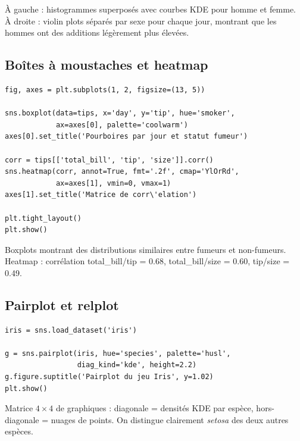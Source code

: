 \begin{codeoutput}
\`A gauche : histogrammes superpos\'es avec courbes KDE pour homme et femme. \`A droite : violin plots s\'epar\'es par sexe pour chaque jour, montrant que les hommes ont des additions l\'eg\`erement plus \'elev\'ees.
\end{codeoutput}

\subsection{Bo\^ites \`a moustaches et heatmap}

\begin{codeblock}[title=\textbf{Python}]
\begin{verbatim}
fig, axes = plt.subplots(1, 2, figsize=(13, 5))

sns.boxplot(data=tips, x='day', y='tip', hue='smoker',
            ax=axes[0], palette='coolwarm')
axes[0].set_title('Pourboires par jour et statut fumeur')

corr = tips[['total_bill', 'tip', 'size']].corr()
sns.heatmap(corr, annot=True, fmt='.2f', cmap='YlOrRd',
            ax=axes[1], vmin=0, vmax=1)
axes[1].set_title('Matrice de corr\'elation')

plt.tight_layout()
plt.show()
\end{verbatim}
\end{codeblock}

\begin{codeoutput}
Boxplots montrant des distributions similaires entre fumeurs et non-fumeurs. Heatmap : corr\'elation total\_bill/tip = 0.68, total\_bill/size = 0.60, tip/size = 0.49.
\end{codeoutput}

\subsection{Pairplot et relplot}

\begin{codeblock}[title=\textbf{Python}]
\begin{verbatim}
iris = sns.load_dataset('iris')

g = sns.pairplot(iris, hue='species', palette='husl',
                 diag_kind='kde', height=2.2)
g.figure.suptitle('Pairplot du jeu Iris', y=1.02)
plt.show()
\end{verbatim}
\end{codeblock}

\begin{codeoutput}
Matrice $4 \times 4$ de graphiques : diagonale = densit\'es KDE par esp\`ece, hors-diagonale = nuages de points. On distingue clairement \emph{setosa} des deux autres esp\`eces.
\end{codeoutput}

